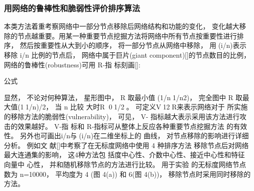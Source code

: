 	\subsubsection{用网络的鲁棒性和脆弱性评价排序算法}
	本类方法着重考察网络中一部分节点移除后网络结构和功能的变化， 变化越大移除的节点越重要。用某一种重要节点挖掘方法将网络中所有节点按重要性进行排序， 然后按重要性从大到小的顺序， 将一部分节点从网络中移除， 用(i/n)表示移除 i/n 比例的节点后， 网络中属于巨片(giant component)[]的节点数目的比例， 网络的鲁棒性(robustness)可用 R-指 标刻画[]:

				公式

				显然， 不论对何种算法， 星形图中， R 取最小值 (1/n1/n2)， 完全图中 R 取最大值(11/n)/2， 当 n 比较 大时R0，1/2。 可定义V12R来表示网络对于 所实施的移除方法的脆弱性(vulnerability)， 可见， V- 指标越大表示采用该方法进行攻击的效果越好。 V-指 标和 R-指标可从整体上反应各种重要节点挖掘方法 的有效性。 另外也可画出i/n与(i/n)在二维坐标上的 曲线， 对节点移除的影响进行详细分析。 例如文 献[]中考察了在无标度网络中使用 4 种排序方法 移除节点后对网络最大连通集的影响， 这4种方法包 括度中心性、介数中心性、接近中心性和特征向量中 心性， 并和随机移除节点的方法进行比较。 用于实验 的无标度网络节点数为 n=10000， 平均度为 4 (图 4(a)) 和 6(图 4(b))， 移除节点时采用同时移除的方法。
